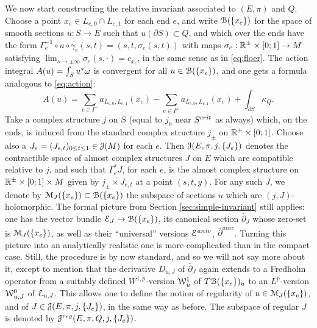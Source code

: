 \documentclass[10pt,letterpaper]{article}
\begin{document}
We now start constructing the relative invariant associated to $(E,\pi)$ and
$Q$. Choose a point $x_e \in L_{e,0} \cap L_{e,1}$ for each end $e$, and write
$\mathcal{B}(\{x_e\})$ for the space of smooth sections $u: S \rightarrow E$ such that
$u(\partial S) \subset Q$, and which over the ends have the form $\Gamma_e^{-1}
\circ u \circ \gamma_e(s,t) = (s,t,\sigma_e(s,t))$ with maps $\sigma_e:
\mathbb{R}^{\pm} \times [0;1] \rightarrow M$ satisfying $\lim_{s \rightarrow \pm
\infty} \sigma_e(s,\cdot) = c_{x_e}$, in the same sense as in \eqref{eq:floer}.
The action integral $A(u) = \int_S u^*\omega$ is convergent for all $u \in
\mathcal{B}(\{x_e\})$, and one gets a formula analogous to \eqref{eq:action}:
\begin{equation} \label{eq:relative-action}
 A(u) = \sum_{e \in I^-} a_{L_{e,0},L_{e,1}}(x_e)
 - \sum_{e \in I^+} a_{L_{e,0},L_{e,1}}(x_e)
 + \int_{\partial S} \kappa_Q.
\end{equation}
Take a complex structure $j$ on $S$ (equal to $j_0$ near $S^{crit}$ as always)
which, on the ends, is induced from the standard complex structure $j_{\pm}$ on
$\mathbb{R}^{\pm} \times [0;1]$. Choose also a $J_e = (J_{e,t})_{0 \leq t \leq 1} \in
\mathcal{J}(M)$ for each $e$. Then $\mathcal{J}(E,\pi,j,\{J_e\})$ denotes the contractible
space of almost complex structures $J$ on $E$ which are compatible relative to
$j$, and such that $\Gamma_e^*J$, for each $e$, is the almost complex structure
on $\mathbb{R}^{\pm} \times [0;1] \times M$ given by $j_{\pm} \times J_{e,t}$ at a
point $(s,t,y)$. For any such $J$, we denote by $\mathcal{M}_J(\{x_e\}) \subset
\mathcal{B}(\{x_e\})$ the subspace of sections $u$ which are $(j,J)$-holomorphic. The
formal picture from Section \ref{sec:simple-invariant} still applies: one has
the vector bundle $\mathcal{E}_J \rightarrow \mathcal{B}(\{x_e\})$, its canonical section
$\bar\partial_J$ whose zero-set is $\mathcal{M}_J(\{x_e\})$, as well as their
``universal'' versions $\mathcal{E}^{univ}$, $\bar\partial^{univ}$. Turning this
picture into an analytically realistic one is more complicated than in the
compact case. Still, the procedure is by now standard, and so we will not say
more about it, except to mention that the derivative $D_{u,J}$ of
$\bar\partial_J$ again extends to a Fredholm operator from a suitably defined
$W^{1,p}$-version $\mathcal{W}^1_u$ of $T\mathcal{B}(\{x_e\})_u$ to an $L^p$-version
$\mathcal{W}^0_{u,J}$ of $\mathcal{E}_{u,J}$. This allows one to define the notion of
regularity of $u \in \mathcal{M}_J(\{x_e\})$, and of $J \in \mathcal{J}(E,\pi,j,\{J_e\})$, in
the same way as before. The subspace of regular $J$ is denoted by
$\mathcal{J}^{reg}(E,\pi,Q,j,\{J_e\})$.
\end{document}
